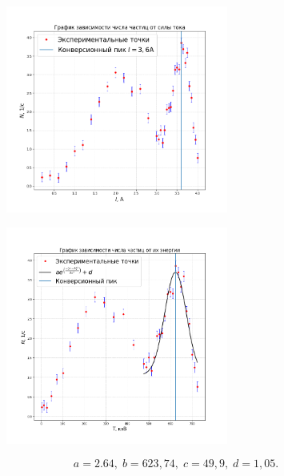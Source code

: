 \documentclass[a4paper,12pt]{article}
\begin{document}
\newpage

\begin{figure}[H]\label{fig: N(I)}
    \centering
    \includegraphics[width = 0.65\textwidth]{N(I).png}
\end{figure}

\begin{figure}[H]\label{fig: N(T)}
    \centering
    \includegraphics[width = 0.65\textwidth]{N(T).png}
\end{figure}
$$
    a = 2.64,\; b = 623,74,\; c = 49,9,\; d = 1,05.
$$
\end{document}
